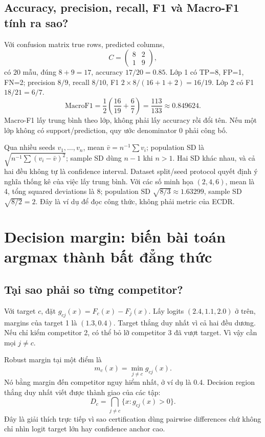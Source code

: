 \documentclass[11pt,a4paper]{article}
\theoremstyle{definition}
\begin{document}
\subsection{Accuracy, precision, recall, F1 và Macro-F1 tính ra sao?}
Với confusion matrix true rows, predicted columns,
\begin{equation}
C=\begin{pmatrix}8&2\\1&9\end{pmatrix},
\end{equation}
có $20$ mẫu, đúng $8+9=17$, accuracy $17/20=0.85$. Lớp 1 có
TP=8, FP=1, FN=2; precision $8/9$, recall $8/10$, F1
$2\times8/(16+1+2)=16/19$. Lớp 2 có F1 $18/21=6/7$.
\begin{equation}
\mathrm{MacroF1}=\frac12\left(\frac{16}{19}+\frac67\right)
=\frac{113}{133}\approx0.849624.
\end{equation}
Macro-F1 lấy trung bình theo lớp, không phải lấy accuracy rồi đổi tên.
Nếu một lớp không có support/prediction, quy ước denominator 0 phải công bố.

Qua nhiều seeds $v_1,\ldots,v_n$, mean $\bar v=n^{-1}\sum v_i$; population
SD là $\sqrt{n^{-1}\sum(v_i-\bar v)^2}$; sample SD dùng $n-1$ khi $n>1$.
Hai SD khác nhau, và cả hai đều không tự là confidence interval. Dataset
split/seed protocol quyết định ý nghĩa thống kê của việc lấy trung bình.
Với các số minh họa $(2,4,6)$, mean là 4, tổng squared deviations là 8;
population SD $\sqrt{8/3}\approx1.63299$, sample SD $\sqrt{8/2}=2$.
Đây là ví dụ để đọc công thức, không phải metric của ECDR.

\section{Decision margin: biến bài toán argmax thành bất đẳng thức}
\subsection{Tại sao phải so từng competitor?}
Với target $c$, đặt $g_{cj}(x)=F_c(x)-F_j(x)$. Lấy logits
$(2.4,1.1,2.0)$ ở trên, margins của target 1 là $(1.3,0.4)$. Target thắng
duy nhất vì cả hai đều dương. Nếu chỉ kiểm competitor 2, có thể bỏ lỡ
competitor 3 đã vượt target. Vì vậy cần mọi $j\ne c$.

Robust margin tại một điểm là
\begin{equation}
m_c(x)=\min_{j\ne c}g_{cj}(x).
\end{equation}
Nó bằng margin đến competitor nguy hiểm nhất, ở ví dụ là 0.4. Decision
region thắng duy nhất viết được thành giao của các tập:
\begin{equation}
D_c=\bigcap_{j\ne c}\{x:g_{cj}(x)>0\}.
\end{equation}
Đây là giải thích trực tiếp vì sao certification dùng pairwise differences
chứ không chỉ nhìn logit target lớn hay confidence anchor cao.
\end{document}

